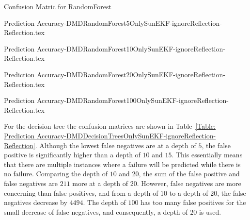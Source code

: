 \documentclass[letterpaper, 10 pt, conference]{ieeeconf}  %
\begin{document}
\begin{table}
	\caption{Confusion Matric for RandomForest} 
	\label{Table: Prediction Accuracy-DMDRandomForestOnlySunEKF-ignoreReflection-Reflection} 
	\centering
	\begin{minipage}[c]{0.2\textwidth}
		{Prediction Accuracy-DMDRandomForest5OnlySunEKF-ignoreReflection-Reflection.tex}
	\end{minipage}
	\begin{minipage}[c]{0.2\textwidth}
		{Prediction Accuracy-DMDRandomForest10OnlySunEKF-ignoreReflection-Reflection.tex}
	\end{minipage}
	\begin{minipage}[c]{0.2\textwidth}
		{Prediction Accuracy-DMDRandomForest20OnlySunEKF-ignoreReflection-Reflection.tex}
	\end{minipage}
	\begin{minipage}[c]{0.2\textwidth}
		{Prediction Accuracy-DMDRandomForest100OnlySunEKF-ignoreReflection-Reflection.tex}
	\end{minipage}
\end{table}

For the decision tree the confusion matrices are shown in Table~\ref{Table: Prediction Accuracy-DMDDecisionTreesOnlySunEKF-ignoreReflection-Reflection}. Although the lowest false negatives are at a depth of $5$, the false positive is significantly higher than a depth of $10$ and $15$. This essentially means that there are multiple instances where a failure will be predicted while there is no failure. Comparing the depth of $10$ and $20$, the sum of the false positive and false negatives are $211$ more at a depth of $20$. However, false negatives are more concerning than false positives, and from a depth of $10$ to a depth of $20$, the false negatives decrease by $4494$. The depth of $100$ has too many false positives for the small decrease of false negatives, and consequently, a depth of $20$ is used.
\end{document}
